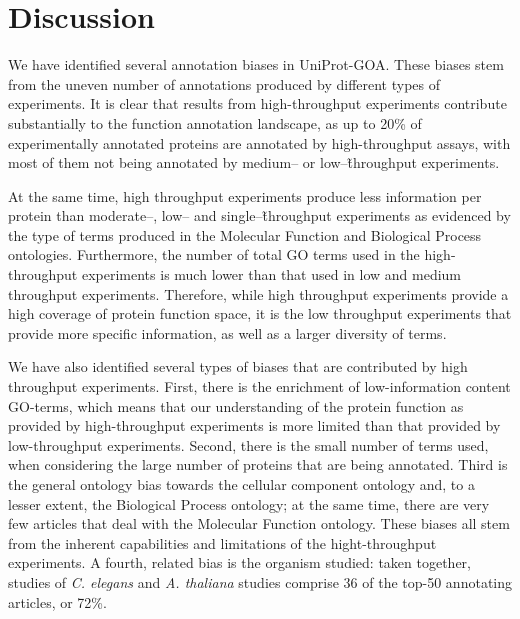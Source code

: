 \documentclass[12pt]{article}
\begin{document}
% 
% 
% 


\section*{Discussion}

We have identified several annotation biases in UniProt-GOA. These biases stem from the
uneven number of annotations produced by different types of experiments. It is clear that
results from high-throughput experiments contribute substantially to the function annotation
landscape, as up to 20\% of experimentally annotated proteins are annotated by
high-throughput assays, with most of them not being annotated by medium-- or
low--\~throughput experiments. 

At the same time, high throughput experiments produce less information per protein than
moderate--, low-- and single--\~throughput experiments as evidenced by the type of terms
produced in the Molecular Function and Biological Process ontologies. Furthermore, the
number of total GO terms used in the high-throughput experiments is much lower than that
used in low and medium throughput experiments. Therefore, while high throughput experiments
provide a high coverage of protein function space, it is the low throughput
experiments that provide more specific information, as well as a larger diversity of terms.

We have also identified several types of biases that are contributed by high throughput experiments.
First, there is the enrichment of low-information content GO-terms, which means that our understanding
of the protein function as provided by high-throughput experiments is more limited than that provided
by low-throughput experiments.  Second, there is the small number of terms used, when considering the
large number of proteins that are being annotated. Third is the general ontology bias towards the
cellular component ontology and, to a lesser extent, the Biological Process ontology; at the same time,
there are very few articles that deal with the Molecular Function ontology.  These biases all stem from
the inherent capabilities and limitations of the hight-throughput experiments.  A fourth, related bias
is the organism studied: taken together, studies of \textit{C. elegans} and \textit{A. thaliana} studies comprise
36 of the top-50 annotating articles, or 72\%.
\end{document}
